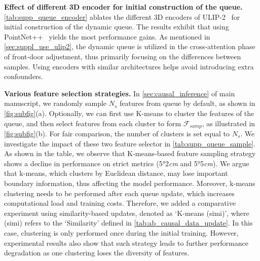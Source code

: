 \vspace{0.1cm}
\noindent
{\bf Effect of different 3D encoder for initial construction of the queue.}
\cref{tab:supp_queue_encoder} ablates the different 3D encoders of ULIP-2~\cite{xue2024ulip} for initial construction of the dynamic queue. The results exhibit that using PointNet++~\cite{qi2017pointnet++} yields the most performance gains.
As mentioned in \cref{sec:suppl_use_ulip2}, the dynamic queue is utilized in the cross-attention phase of front-door adjustment, thus primarily focusing on the differences between samples. Using encoders with similar architectures helps avoid introducing extra confounders.

\vspace{0.1cm}
\noindent
{\bf Various feature selection strategies.} In \cref{sec:causal_inference} of main manuscript, we randomly sample $N_s$ features from queue by default, as shown in \cref{fig:subfig}(a). Optionally, we can first use K-means to cluster the features of the queue, and then select features from each cluster to form $\mathcal{F}_{samp}$, as illustrated in \cref{fig:subfig}(b). For fair comparison, the number of clusters is set equal to $N_s$. 
We investigate the impact of these two feature selector in \cref{tab:supp_queue_sample}. As shown in the table, we observe that K-means-based feature sampling strategy shows a decline in performance on strict metrics (5°2\emph{cm} and 5°5\emph{cm}). We argue that k-means, which clusters by Euclidean distance, may lose important boundary information, thus affecting the model performance. Moreover, k-means clustering needs to be performed after each queue update, which increases computational load and training costs. Therefore, we added a comparative experiment using similarity-based updates, denoted as ‘K-means (simi)’, where (simi) refers to the ‘Similarity’ defined in \cref{tab:ab_causal_data_update}. In this case, clustering is only performed once during the initial training. However, experimental results also show that such strategy leads to further performance degradation as one clustering loses the diversity of features.



